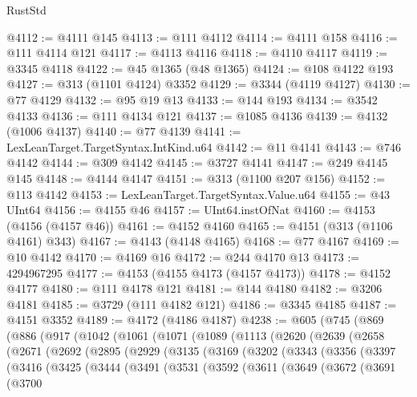 \begin{lexlean}{RustStd}
\begin{coremodule}
@4112 := @4111 @145
@4113 := @111 @4112
@4114 := @4111 @158
@4116 := @111 @4114 @121
@4117 := @4113 @4116
@4118 := @4110 @4117
@4119 := @3345 @4118
@4122 := @45 @1365 (@48 @1365)
@4124 := @108 @4122 @193
@4127 := @313 (@1101 @4124) @3352
@4129 := @3344 (@4119 @4127)
@4130 := @77 @4129
@4132 := @95 @19 @13
@4133 := @144 @193
@4134 := @3542 @4133
@4136 := @111 @4134 @121
@4137 := @1085 @4136
@4139 := @4132 (@1006 @4137)
@4140 := @77 @4139
@4141 := LexLeanTarget.TargetSyntax.IntKind.u64
@4142 := @11 @4141
@4143 := @746 @4142
@4144 := @309 @4142
@4145 := @3727 @4141
@4147 := @249 @4145 @145
@4148 := @4144 @4147
@4151 := @313 (@1100 @207 @156)
@4152 := @113 @4142
@4153 := LexLeanTarget.TargetSyntax.Value.u64
@4155 := @43 UInt64
@4156 := @4155 @46
@4157 := UInt64.instOfNat
@4160 := @4153 (@4156 (@4157 @46))
@4161 := @4152 @4160
@4165 := @4151 (@313 (@1106 @4161) @343)
@4167 := @4143 (@4148 @4165)
@4168 := @77 @4167
@4169 := @10 @4142
@4170 := @4169 @16
@4172 := @244 @4170 @13
@4173 := 4294967295
@4177 := @4153 (@4155 @4173 (@4157 @4173))
@4178 := @4152 @4177
@4180 := @111 @4178 @121
@4181 := @144 @4180
@4182 := @3206 @4181
@4185 := @3729 (@111 @4182 @121)
@4186 := @3345 @4185
@4187 := @4151 @3352
@4189 := @4172 (@4186 @4187)
@4238 := @605
    (@745
      (@869
        (@886
          (@917
            (@1042
              (@1061
                (@1071
                  (@1089
                    (@1113
                      (@2620
                        (@2639
                          (@2658
                            (@2671
                              (@2692
                                (@2895
                                  (@2929
                                    (@3135
                                      (@3169
                                        (@3202
                                          (@3343
                                            (@3356
                                              (@3397
                                                (@3416
                                                  (@3425
                                                    (@3444
                                                      (@3491
                                                        (@3531
                                                          (@3592
                                                            (@3611
                                                              (@3649
                                                                (@3672
                                                                  (@3691
                                                                    (@3700

\end{coremodule}
\end{lexlean}
